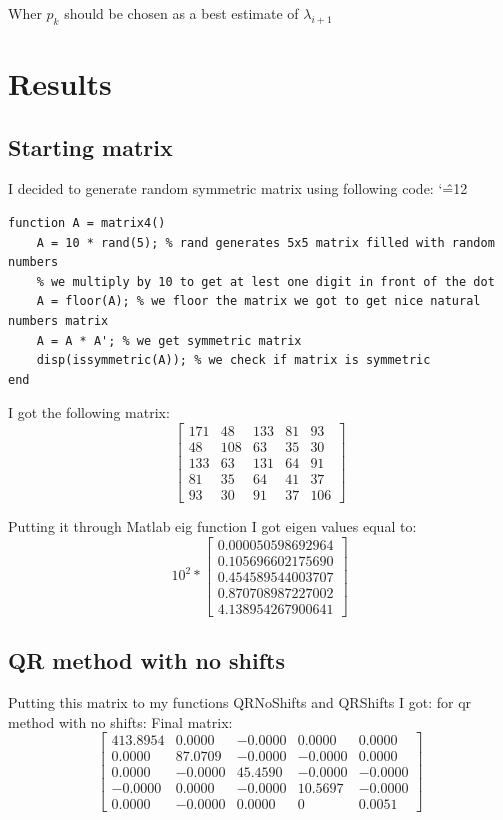 \documentclass[12pt]{report}
\newenvironment{simplechar}{%
   \catcode`\^=12
}{}
\begin{document}
Wher $p_k$ should be chosen as a best estimate of $\lambda_{i+1}$

\section{Results}
\subsection{Starting matrix}
I decided to generate random symmetric matrix using following code:
\begin{simplechar}
\begin{lstlisting}
function A = matrix4()
    A = 10 * rand(5); % rand generates 5x5 matrix filled with random numbers
    % we multiply by 10 to get at lest one digit in front of the dot
    A = floor(A); % we floor the matrix we got to get nice natural numbers matrix
    A = A * A'; % we get symmetric matrix
    disp(issymmetric(A)); % we check if matrix is symmetric
end
\end{lstlisting}
\end{simplechar}
I got the following matrix:
\[
\begin{bmatrix}
171  &  48  & 133  &  81  &  93 \\
 48  & 108  &  63  &  35  &  30 \\
133  &  63  & 131  &  64  &  91 \\
 81  &  35  &  64  &  41  &  37 \\
 93  &  30  &  91  &  37  & 106
\end{bmatrix}
\]

Putting it through Matlab eig function I got eigen values equal to:
\[
10^{2} *
\begin{bmatrix}
  0.000050598692964 \\
  0.105696602175690 \\
  0.454589544003707 \\
  0.870708987227002 \\
  4.138954267900641
\end{bmatrix}
\]


\subsection{QR method with no shifts}
Putting this matrix to my functions QRNoShifts and QRShifts I got:
for qr method with no shifts:
Final matrix:
\[
\begin{bmatrix}
413.8954  &  0.0000  & -0.0000  &  0.0000  &  0.0000 \\
 0.0000  & 87.0709  &  -0.0000  &  -0.0000  &  0.0000 \\
0.0000  &  -0.0000  & 45.4590  &  -0.0000  &  -0.0000 \\
 -0.0000  &  0.0000  &  -0.0000  &  10.5697  &  -0.0000 \\
 0.0000  &  -0.0000  &  0.0000  &  0  & 0.0051
\end{bmatrix}
\]
\end{document}
